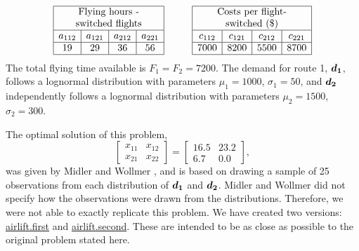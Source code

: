 \[
\begin{array}{|c|c|c|c|}
\hline
\multicolumn{4}{|c|}{\mbox{Flying hours -}}\\
\multicolumn{4}{|c|}{\mbox{switched flights}}\\
\hline
a_{112}	& a_{121} & a_{212} & a_{221}\\
\hline
19 & 29 & 36 & 56\\
\hline
\end{array}
\hspace{1cm}
\begin{array}{|c|c|c|c|}
\hline
\multicolumn{4}{|c|}{\mbox{Costs per flight-}}\\
\multicolumn{4}{|c|}{\mbox{switched (\$)}}\\%
\hline
c_{112} & c_{121} & c_{212} & c_{221}\\
\hline
7000 & 8200 & 5500 & 8700\\
\hline
\end{array}
\]
The total flying time available is $F_1 = F_2 = 7200$.  The demand for route 1, $\mathbf{\boldsymbol{d_1}}$, follows a lognormal distribution with parameters $\mu_1 = 1000$, $\sigma_1 = 50$, and $\mathbf{\boldsymbol{d_2}}$ independently follows a lognormal distribution with parameters $\mu_2 = 1500$, $\sigma_2=300$.

The optimal solution of this problem, 
\begin{equation*}
\left[\begin{array}{cccc}
	x_{11} & x_{12}\\
	x_{21} & x_{22}
	\end{array}\right]
=
\left[\begin{array}{rrrr}
	16.5 & 23.2\\
	6.7 & 0.0
	\end{array}\right],
\end{equation*}
was given by Midler and Wollmer \cite{midler69}, and is based on drawing a sample of 25 observations from each distribution of $\mathbf{\boldsymbol{d_1}}$ and $\mathbf{\boldsymbol{d_2}}$.  Midler and Wollmer \cite{midler69} did not specify how the observations were drawn from the distributions.  Therefore, we were not able to exactly replicate this problem.  We have created two versions:  \url{airlift.first} and \url{airlift.second}.  These are intended to be as close as possible to the original problem stated here.



